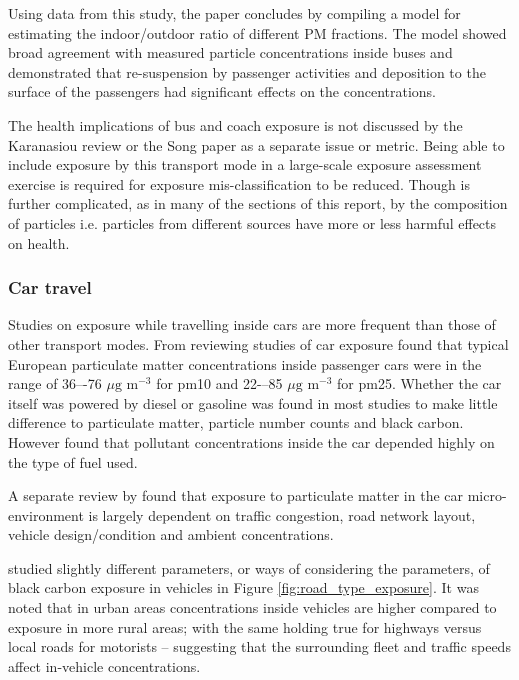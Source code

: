 Using data from this study, the \cite{Song2009} paper concludes by compiling a model for estimating the indoor/outdoor ratio of different PM fractions. The model showed broad agreement with measured particle concentrations inside buses and demonstrated that re-suspension by passenger activities and deposition to the surface of the passengers had significant effects on the concentrations.

The health implications of bus and coach exposure is not discussed by the Karanasiou review or the Song paper as a separate issue or metric. Being able to include exposure by this transport mode in a large-scale exposure assessment exercise is required for exposure mis-classification to be reduced. Though is further complicated, as in many of the sections of this report, by the composition of particles i.e. particles from different sources have more or less harmful effects on health.


\subsubsection{Car travel}
\label{sec:car}

Studies on exposure while travelling inside cars are more frequent than those of other transport modes. From reviewing studies of car exposure \cite{Karanasiou2014} found that typical European particulate matter concentrations inside passenger cars were in the range of 36–-76 $\mu \text{g m}^{-3}$ for \gls{pm10} and 22-–85 $\mu \text{g m}^{-3}$ for \gls{pm25}. Whether the car itself was powered by diesel or gasoline was found in most studies to make little difference to particulate matter, particle number counts and black carbon. However \cite{Jalava2012} found that pollutant concentrations inside the car depended highly on the type of fuel used.

A separate review by \cite{Nasir2009} found that exposure to particulate matter in the car micro-environment is largely dependent on traffic congestion, road network layout, vehicle design/condition and ambient concentrations.

\cite{Dons2013} studied slightly different parameters, or ways of considering the parameters, of black carbon exposure in vehicles in Figure \ref{fig:road_type_exposure}. It was noted that in urban areas concentrations inside vehicles are higher compared to exposure in more rural areas; with the same holding true for highways versus local roads for motorists -- suggesting that the surrounding fleet and traffic speeds affect in-vehicle concentrations.

